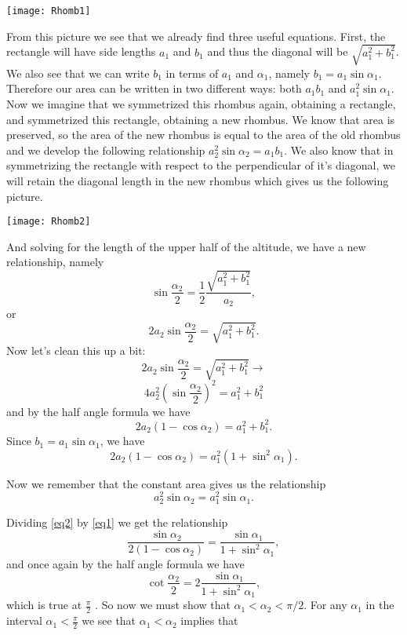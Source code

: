 \documentclass[12pt]{report}
\numberwithin{definition}{section}
\begin{document}
	
\texttt{[image: Rhomb1]}
		
	From this picture we see that we already find three useful equations. First, the rectangle will have side lengths $ a_1 $ and $b_1$ and thus the diagonal will be $\sqrt{a_1^2+b_1^2}$. We also see that we can write $b_1$ in terms of $a_1$ and $\alpha_1$, namely $b_1 = a_1\sin{\alpha_1}$. Therefore our area can be written in two different ways: both $a_1b_1$ and $a_1^2\sin{\alpha_1}$. Now we imagine that we symmetrized this rhombus again, obtaining a rectangle, and symmetrized this rectangle, obtaining a new rhombus. We know that area is preserved, so the area of the new rhombus is equal to the area of the old rhombus and we develop the following relationship  $a_2^2\sin{\alpha_2} = a_1b_1$. We also know that in symmetrizing the rectangle with respect to the perpendicular of it's diagonal, we will retain the diagonal length in the new rhombus which gives us the following picture. 
	
	\texttt{[image: Rhomb2]}
	
And solving for the length of the upper half of the altitude, we have a new relationship, namely 
\[
\sin{\frac{\alpha_2}{2}} = \frac{1}{2} \frac{\sqrt{a_1^2+b_1^2}}{a_2},
\]
 or 
 \[
 2a_2\sin{\frac{\alpha_2}{2}} = \sqrt{a_1^2+b_1^2}.
 \]
Now let's clean this up a bit:
\[
 2a_2\sin{\frac{\alpha_2}{2}} = \sqrt{a_1^2+b_1^2} \rightarrow
 \]
\[
4a_2^2(\sin{\frac{\alpha_2}{2}})^2  = a_1^2+b_1^2
\]
and by the half angle formula we have 
\[
 2a_2(1-\cos{\alpha_2}) = a_1^2+b_1^2.
 \]
 Since $b_1 = a_1\sin{\alpha_1}$, we have 
\begin{equation}\label{eq1}
 2a_2(1-\cos{\alpha_2}) = a_1^2(1+\sin^2{\alpha_1}).
\end{equation}
 
Now we remember that the constant area gives us the relationship 
\begin{equation}\label{eq2}
     a_2^2\sin{\alpha_2} = a_1^2\sin{\alpha_1}.
\end{equation}

Dividing \eqref{eq2} by \eqref{eq1} we get the relationship 
\[
\frac{\sin{\alpha_2}}{2(1-\cos{\alpha_2})}= \frac{\sin{\alpha_1}}{1+\sin^2{\alpha_1}},
\]
and once again by the half angle formula we have 
\[
\cot{\frac{\alpha_2}{2}} = 2\frac{\sin{\alpha_1}}{1+\sin^2{\alpha_1}},
\]
which is true at $\frac{\pi}{2}$ . So now we must show that $\alpha_1 <\alpha_2 < \pi/2 $. For any $\alpha_1$ in the interval $\alpha_1 < \frac{\pi}{2}$ we see that $\alpha_1 < \alpha_2 $ implies that 
\end{document}
